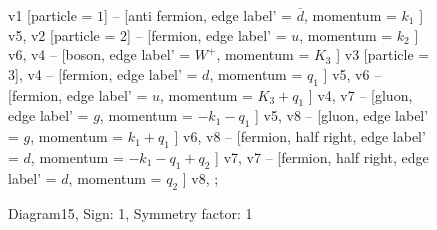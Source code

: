 \documentclass{revtex4}
\begin{document}
\begin{figure}[!htb]
\begin{center}
{    %
v1 [particle = \(1\)] -- [anti fermion, edge label' = \(\overline{d}\), momentum = \(k_{1}\) ] v5, 
v2 [particle = \(2\)] -- [fermion, edge label' = \(u\), momentum = \(k_{2}\) ] v6, 
v4 -- [boson, edge label' = \(W^{+}\), momentum = \(K_{3}\) ] v3 [particle = \(3\)], 
v4 -- [fermion, edge label' = \(d\), momentum = \(q_{1}\) ] v5, 
v6 -- [fermion, edge label' = \(u\), momentum = \(K_{3} + q_{1}\) ] v4, 
v7 -- [gluon, edge label' = \(g\), momentum = \(-k_{1} - q_{1}\) ] v5, 
v8 -- [gluon, edge label' = \(g\), momentum = \(k_{1} + q_{1}\) ] v6, 
v8 -- [fermion, half right, edge label' = \(d\), momentum = \(-k_{1} - q_{1} + q_{2}\) ] v7, 
v7 -- [fermion, half right, edge label' = \(d\), momentum = \(q_{2}\) ] v8, 
};
\end{center}
\caption{Diagram15, Sign: 1, Symmetry factor: 1}
\end{figure}
\newpage
\end{document}
